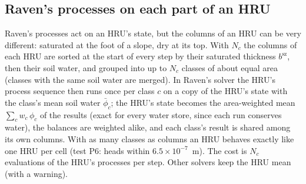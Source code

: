 \subsection{Raven's processes on each part of an HRU}\label{sec:szclasses}
Raven's processes act on an HRU's state, but the columns of an HRU can be very different: saturated at the foot of a
slope, dry at its top. With  $N_c$ the columns of each HRU are sorted at the start of every step by
their saturated thickness $b^{\mathrm{sz}}$, then their soil water, and grouped into up to $N_c$ classes of about equal area
(classes with the same soil water are merged). In Raven's  solver the HRU's process sequence then
runs once per class $c$ on a copy of the HRU's state with the class's mean soil water $\bar\phi_c$; the HRU's state
becomes the area-weighted mean $\sum_cw_c\,\phi_c$ of the results (exact for every water store, since each run
conserves water), the balances are weighted alike, and each class's result is shared among its own columns. With as
many classes as columns an HRU behaves exactly like one HRU per cell (test P6: heads within $6.5\times10^{-7}$~m). The cost is $N_c$
evaluations of the HRU's processes per step. Other solvers keep the HRU mean (with a warning).

